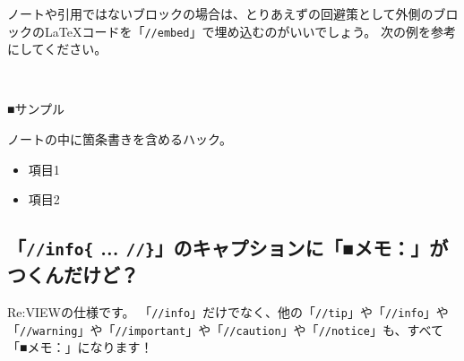ノートや引用ではないブロックの場合は、とりあえずの回避策として外側のブロックの\LaTeX{}コードを「\texttt{//embed}」で埋め込むのがいいでしょう。
次の例を参考にしてください。

\begin{starterprogram}\end{starterprogram}
\noindent
{}\\

\begin{starternote}{■サンプル}  %

ノートの中に箇条書きを含めるハック。

\begin{itemize}
\item 項目1
\item 項目2
\end{itemize}

\end{starternote}  %
\vspace*{\baselineskip}

\subsection{「\texttt{//info\{} ... \texttt{//\}}」のキャプションに「■メモ：」がつくんだけど？}
\label{sec:2-3-3}
\label{subsec-faq-memo}

Re:VIEWの仕様です。
「\texttt{//info}」だけでなく、他の「\texttt{//tip}」や「\texttt{//info}」や「\texttt{//warning}」や「\texttt{//important}」や「\texttt{//caution}」や「\texttt{//notice}」も、すべて「■メモ：」になります！

\begin{starterprogram}\end{starterprogram}
\noindent
{}\\

\begin{reviewminicolumn}

\end{reviewminicolumn}
\vspace*{\baselineskip}
\begin{starterprogram}\end{starterprogram}
\noindent
{}\\

